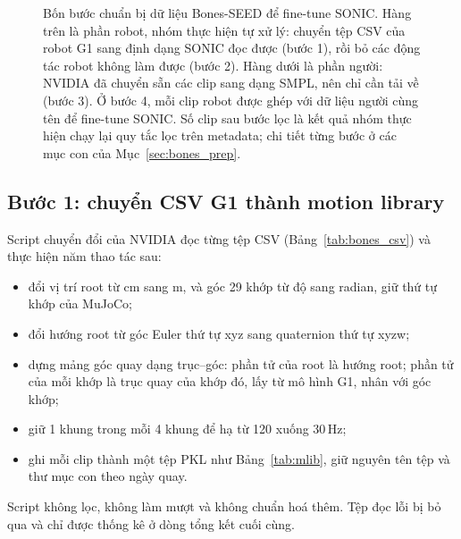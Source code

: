 \documentclass[12pt,a4paper,oneside]{report}
\begin{document}
\begin{figure}[htbp]
{}
\caption[Bốn bước chuẩn bị dữ liệu Bones-SEED để fine-tune SONIC]{Bốn bước chuẩn bị dữ liệu Bones-SEED để fine-tune SONIC. Hàng trên là phần robot, nhóm thực hiện tự xử lý: chuyển tệp CSV của robot G1 sang định dạng SONIC đọc được (bước 1), rồi bỏ các động tác robot không làm được (bước 2). Hàng dưới là phần người: NVIDIA đã chuyển sẵn các clip sang dạng SMPL, nên chỉ cần tải về (bước 3). Ở bước 4, mỗi clip robot được ghép với dữ liệu người cùng tên để fine-tune SONIC. Số clip sau bước lọc là kết quả nhóm thực hiện chạy lại quy tắc lọc trên metadata; chi tiết từng bước ở các mục con của Mục~\ref{sec:bones_prep}.}
\label{fig:seed_prep}
\end{figure}

\subsection{Bước 1: chuyển CSV G1 thành motion library}

Script chuyển đổi của NVIDIA đọc từng tệp CSV (Bảng~\ref{tab:bones_csv}) và thực hiện năm thao tác sau:
\begin{itemize}
\item đổi vị trí root từ cm sang m, và góc 29 khớp từ độ sang radian, giữ thứ tự khớp của MuJoCo;
\item đổi hướng root từ góc Euler thứ tự xyz sang quaternion thứ tự xyzw;
\item dựng mảng góc quay dạng trục--góc: phần tử của root là hướng root; phần tử của mỗi khớp là trục quay của khớp đó, lấy từ mô hình G1, nhân với góc khớp;
\item giữ 1 khung trong mỗi 4 khung để hạ từ 120 xuống 30\,Hz;
\item ghi mỗi clip thành một tệp PKL như Bảng~\ref{tab:mlib}, giữ nguyên tên tệp và thư mục con theo ngày quay.
\end{itemize}
Script không lọc, không làm mượt và không chuẩn hoá thêm. Tệp đọc lỗi bị bỏ qua và chỉ được thống kê ở dòng tổng kết cuối cùng.
\end{document}

